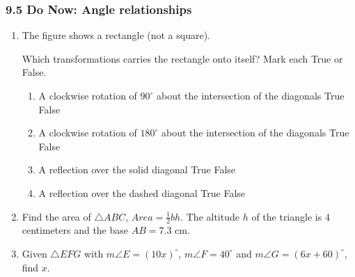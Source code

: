 \documentclass[12pt, twoside]{article}
\begin{document}
\subsubsection*{9.5 Do Now: Angle relationships}
 \begin{enumerate}

\item The figure shows a rectangle (not a square).
  \begin{center}
  \end{center}
  Which transformations carries the rectangle onto itself? Mark each True or False.
    \begin{enumerate}
      \item A clockwise rotation of $90^\circ$ about the intersection of the diagonals \hfill True \quad False
      \item A clockwise rotation of $180^\circ$ about the intersection of the diagonals \hfill True \quad False
      \item A reflection over the solid diagonal \hfill True \quad False
      \item A reflection over the dashed diagonal \hfill True \quad False
    \end{enumerate}

       \item Find the area of $\triangle ABC$,  $Area= \frac{1}{2}bh$. The altitude $h$ of the triangle is 4 centimeters and the base $AB=7.3$ cm.\\[1cm]

   \item Given  $\triangle EFG$ with $m\angle E=(10x)^\circ$, $m\angle F=40^\circ$ and $m\angle G=(6x+60)^\circ$, find $x$.
     \begin{center}
     \end{center} \vspace{3cm}


\end{enumerate}
\end{document}

